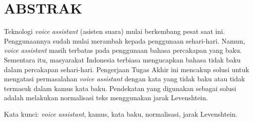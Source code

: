 \clearpage
\chapter*{ABSTRAK}

Teknologi \textit{voice assistant} (asisten suara) mulai berkembang pesat saat ini. Penggunaannya sudah mulai merambah kepada penggunaan sehari-hari. Namun, \textit{voice assistant} masih terbatas pada penggunaan bahasa percakapan yang baku. Sementara itu, masyarakat Indonesia terbiasa mengucapkan bahasa tidak baku dalam percakapan sehari-hari. Pengerjaan Tugas Akhir ini mencakup solusi untuk mengatasi permasalahan \textit{voice assistant} dengan kata yang tidak baku atau tidak termasuk dalam kamus kata baku. Pendekatan yang digunakan sebagai solusi adalah melakukan normalisasi teks menggunakan jarak Levenshtein.

\vspace{15mm}
Kata kunci: \textit{voice assistant}, kamus, kata baku, normalisasi, jarak Levenshtein.
\clearpage